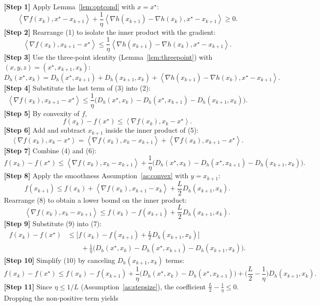 \documentclass[11pt]{article}
\newcommand{\inner}[2]{\left\langle #1,#2\right\rangle}
\newcommand{\Breg}[2]{D_{h}(#1,#2)}
\newcommand{\grad}{\nabla}
\begin{document}
\medskip
\noindent\textbf{[Step 1]}  Apply Lemma~\ref{lem:optcond} with $x=x^{\star}$:
\[
\inner{\grad f(x_k)}{x^{\star}-x_{k+1}}
+\frac{1}{\eta}\inner{\grad h(x_{k+1})-\grad h(x_k)}{x^{\star}-x_{k+1}}
\ge 0.
\tag{1}
\]
\textbf{[Step 2]}  Rearrange (1) to isolate the inner product with the gradient:
\[
\inner{\grad f(x_k)}{x_{k+1}-x^{\star}}
\le
\frac{1}{\eta}\inner{\grad h(x_{k+1})-\grad h(x_k)}{x^{\star}-x_{k+1}}.
\tag{2}
\]
\textbf{[Step 3]}  Use the three‑point identity (Lemma~\ref{lem:threepoint}) with
$(x,y,z)=(x^{\star},x_{k+1},x_k)$:
\[
\Breg{x^{\star}}{x_k}= \Breg{x^{\star}}{x_{k+1}}+\Breg{x_{k+1}}{x_k}
+\inner{\grad h(x_{k+1})-\grad h(x_k)}{x^{\star}-x_{k+1}}.
\tag{3}
\]
\textbf{[Step 4]}  Substitute the last term of (3) into (2):
\[
\inner{\grad f(x_k)}{x_{k+1}-x^{\star}}
\le
\frac{1}{\eta}\Big(\Breg{x^{\star}}{x_k}
-\Breg{x^{\star}}{x_{k+1}}-\Breg{x_{k+1}}{x_k}\Big).
\tag{4}
\]
\textbf{[Step 5]}  By convexity of $f$,
\[
f(x_k)-f(x^{\star})\le\inner{\grad f(x_k)}{x_k-x^{\star}}.
\tag{5}
\]
\textbf{[Step 6]}  Add and subtract $x_{k+1}$ inside the inner product of (5):
\[
\inner{\grad f(x_k)}{x_k-x^{\star}}
=
\inner{\grad f(x_k)}{x_k-x_{k+1}}
+\inner{\grad f(x_k)}{x_{k+1}-x^{\star}}.
\tag{6}
\]
\textbf{[Step 7]}  Combine (4) and (6):
\[
f(x_k)-f(x^{\star})
\le
\inner{\grad f(x_k)}{x_k-x_{k+1}}
+\frac{1}{\eta}\Big(\Breg{x^{\star}}{x_k}
-\Breg{x^{\star}}{x_{k+1}}-\Breg{x_{k+1}}{x_k}\Big).
\tag{7}
\]
\textbf{[Step 8]}  Apply the smoothness Assumption~\ref{as:convex} with $y=x_{k+1}$:
\[
f(x_{k+1})\le f(x_k)+\inner{\grad f(x_k)}{x_{k+1}-x_k}
+\frac{L}{2}\Breg{x_{k+1}}{x_k}.
\tag{8}
\]
Rearrange (8) to obtain a lower bound on the inner product:
\[
\inner{\grad f(x_k)}{x_k-x_{k+1}}
\le f(x_k)-f(x_{k+1})+\frac{L}{2}\Breg{x_{k+1}}{x_k}.
\tag{9}
\]
\textbf{[Step 9]}  Substitute (9) into (7):
\[
\begin{aligned}
f(x_k)-f(x^{\star})
&\le
\bigl[f(x_k)-f(x_{k+1})+\tfrac{L}{2}\Breg{x_{k+1}}{x_k}\bigr] \\
&\qquad+\frac{1}{\eta}\Big(\Breg{x^{\star}}{x_k}
-\Breg{x^{\star}}{x_{k+1}}-\Breg{x_{k+1}}{x_k}\Big) .
\end{aligned}
\tag{10}
\]
\textbf{[Step 10]}  Simplify (10) by canceling $\Breg{x_{k+1}}{x_k}$ terms:
\[
f(x_k)-f(x^{\star})
\le
f(x_k)-f(x_{k+1})
+\frac{1}{\eta}\bigl(\Breg{x^{\star}}{x_k}
-\Breg{x^{\star}}{x_{k+1}}\bigr)
+\Big(\frac{L}{2}-\frac{1}{\eta}\Big)\Breg{x_{k+1}}{x_k}.
\tag{11}
\]
\textbf{[Step 11]}  Since $\eta\le 1/L$ (Assumption~\ref{as:stepsize}), the coefficient
$\frac{L}{2}-\frac{1}{\eta}\le 0$. Dropping the non‑positive term yields
\end{document}
